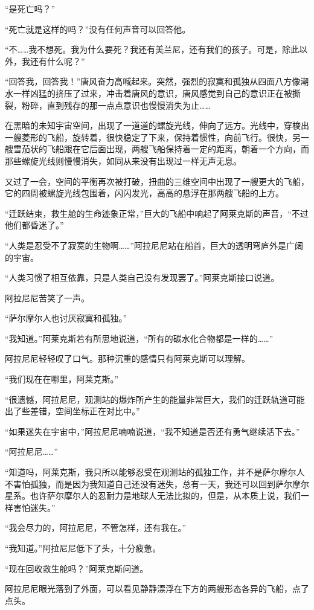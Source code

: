 “是死亡吗？”

“死亡就是这样的吗？”没有任何声音可以回答他。

“不……我不想死。我为什么要死？我还有美兰尼，还有我们的孩子。可是，除此以外，我还有什么呢？”

“回答我，回答我！”唐风奋力高喊起来。突然，强烈的寂寞和孤独从四面八方像潮水一样凶猛的挤压了过来，冲击着唐风的意识，唐风感觉到自己的意识正在被撕裂，粉碎，直到残存的那一点点意识也慢慢消失为止……

在黑暗的未知宇宙空间，出现了一道道的螺旋光线，伸向了远方。光线中，穿梭出一艘菱形的飞船，旋转着，很快稳定了下来，保持着惯性，向前飞行。很快，另一艘雪茄状的飞船跟在它后面出现，两艘飞船保持着一定的距离，朝着一个方向，而那些螺旋光线则慢慢消失，如同从来没有出现过一样无声无息。

又过了一会，空间的平衡再次被打破，扭曲的三维空间中出现了一艘更大的飞船，它的四周被螺旋光线包围着，闪闪发光，高高的悬浮在那两艘飞船的上方。

“迁跃结束，救生舱的生命迹象正常，”巨大的飞船中响起了阿莱克斯的声音，“不过他们都昏迷了。”

“人类是忍受不了寂寞的生物啊……”阿拉尼尼站在船首，巨大的透明穹庐外是广阔的宇宙。

“人类习惯了相互依靠，只是人类自己没有发现罢了。”阿莱克斯接口说道。

阿拉尼尼苦笑了一声。

“萨尔摩尔人也讨厌寂寞和孤独。”

“我知道。”阿莱克斯若有所思地说道，“所有的碳水化合物都是一样的……”

阿拉尼尼轻轻叹了口气。那种沉重的感情只有阿莱克斯可以理解。

“我们现在在哪里，阿莱克斯。”

“很遗憾，阿拉尼尼，观测站的爆炸所产生的能量非常巨大，我们的迁跃轨道可能出了些差错，空间坐标正在对比中。”

“如果迷失在宇宙中，”阿拉尼尼喃喃说道，“我不知道是否还有勇气继续活下去。”

“阿拉尼尼……”

“知道吗，阿莱克斯，我只所以能够忍受在观测站的孤独工作，并不是萨尔摩尔人不害怕孤独，而是因为我知道自己还没有迷失，总有一天，我还可以回到萨尔摩尔星系。也许萨尔摩尔人的忍耐力是地球人无法比拟的，但是，从本质上说，我们一样害怕迷失。”

“我会尽力的，阿拉尼尼，不管怎样，还有我在。”

“我知道。”阿拉尼尼低下了头，十分疲惫。

“现在回收救生舱吗？”阿莱克斯问道。

阿拉尼尼眼光落到了外面，可以看见静静漂浮在下方的两艘形态各异的飞船，点了点头。

